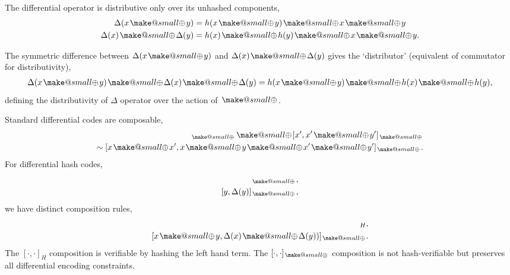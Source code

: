 \documentclass[twocolumn, aps, amsmath, amssymb, nofootinbib, superscriptaddress, longbibliography, doublefloatfix, table-of-contents, eqsecnum, rmp]{revtex4-2}
\makeatletter
\newcommand{\soplus}{{{\hspace{1pt}}{\mathbin{\mathpalette\make@small{\mathbin\oplus}}}}{\hspace{1pt}}}
\newcommand{\make@small}[2]{%
  \vcenter{\hbox{%
    \scalebox{0.6}{$\m@th#1#2$}%
  }}%
}
\makeatother
\begin{document}
The differential operator is distributive only over its unhashed components,
\begin{align}
	\Delta(x\soplus y) &= h(x\soplus y)\soplus x\soplus y \nonumber\\
	\Delta(x)\soplus\Delta(y) &= h(x)\soplus h(y)\soplus x\soplus y.
\end{align}





The symmetric difference between $\Delta(x\soplus y)$ and $\Delta(x)\soplus\Delta(y)$ gives the `distributor' (equivalent of commutator for distributivity),
\begin{align}
	\Delta(x\soplus y)\soplus \Delta(x)\soplus \Delta(y) = h(x\soplus y) \soplus h(x)\soplus h(y),
\end{align}
defining the distributivity of $\Delta$ operator over the action of $\soplus$.

Standard differential codes are composable,
\begin{align}
	[x,x\soplus y)]_\soplus \soplus [x',x'\soplus y']_\soplus\nonumber\\
	\sim [x\soplus x', x\soplus y \soplus x' \soplus y']_\soplus.
\end{align}
For differential hash codes,
\begin{align}
	[x,\Delta(x)]_\soplus,\nonumber\\
	[y,\Delta(y)]_\soplus,
\end{align}
we have distinct composition rules,
\begin{align}
	[x\soplus y,\Delta(x\soplus y)]_H,\nonumber\\
	[x\soplus y,\Delta(x) \soplus \Delta(y))]_\soplus.
\end{align}
The $[\cdot,\cdot]_H$ composition is verifiable by hashing the left hand term. The $[\cdot,\cdot]_\soplus$ composition is not hash-verifiable but preserves all differential encoding constraints.
\end{document}
